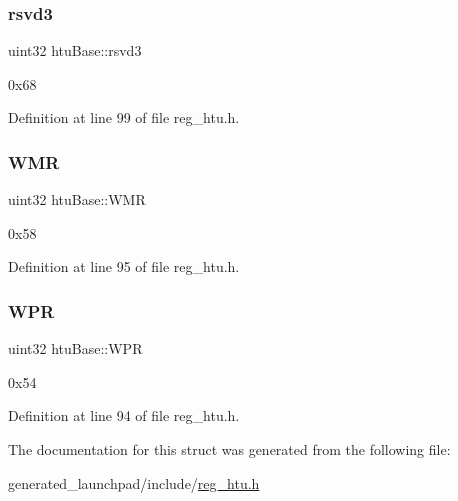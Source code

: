 \subsubsection{\texorpdfstring{rsvd3}{rsvd3}}
{\footnotesize\ttfamily uint32 htu\+Base\+::rsvd3}

0x68 

Definition at line 99 of file reg\+\_\+htu.\+h.

\mbox{\label{structhtuBase_a4dce3c11df89934c6ca546b3f643315b}} 
\subsubsection{\texorpdfstring{W\+MR}{WMR}}
{\footnotesize\ttfamily uint32 htu\+Base\+::\+W\+MR}

0x58 

Definition at line 95 of file reg\+\_\+htu.\+h.

\mbox{\label{structhtuBase_ae4a9e4a7b755cf8eb1b0c957a331c6e6}} 
\subsubsection{\texorpdfstring{W\+PR}{WPR}}
{\footnotesize\ttfamily uint32 htu\+Base\+::\+W\+PR}

0x54 

Definition at line 94 of file reg\+\_\+htu.\+h.



The documentation for this struct was generated from the following file\+:\begin{DoxyCompactItemize}
\item 
generated\+\_\+launchpad/include/\mbox{\hyperlink{reg__htu_8h}{reg\+\_\+htu.\+h}}\end{DoxyCompactItemize}
